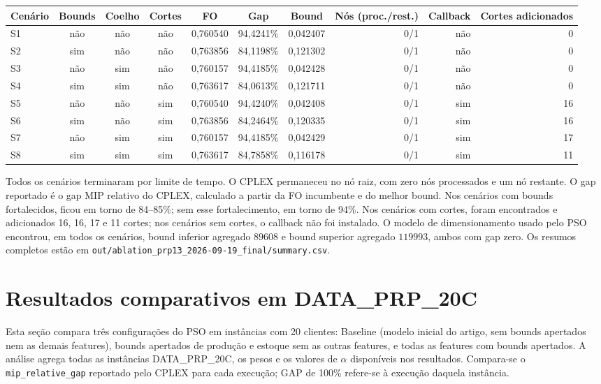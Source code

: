 \documentclass[11pt,a4paper]{article}
\begin{document}
\begin{center}
\small
\begin{tabular}{lccccccrrr}
\toprule
Cenário & Bounds & Coelho & Cortes & FO & Gap & Bound & Nós (proc./rest.) & Callback & Cortes adicionados \\
\midrule
S1 & não & não & não & 0,760540 & 94,4241\% & 0,042407 & 0/1 & não & 0 \\
S2 & sim & não & não & 0,763856 & 84,1198\% & 0,121302 & 0/1 & não & 0 \\
S3 & não & sim & não & 0,760157 & 94,4185\% & 0,042428 & 0/1 & não & 0 \\
S4 & sim & sim & não & 0,763617 & 84,0613\% & 0,121711 & 0/1 & não & 0 \\
S5 & não & não & sim & 0,760540 & 94,4240\% & 0,042408 & 0/1 & sim & 16 \\
S6 & sim & não & sim & 0,763856 & 84,2464\% & 0,120335 & 0/1 & sim & 16 \\
S7 & não & sim & sim & 0,760157 & 94,4185\% & 0,042429 & 0/1 & sim & 17 \\
S8 & sim & sim & sim & 0,763617 & 84,7858\% & 0,116178 & 0/1 & sim & 11 \\
\bottomrule
\end{tabular}
\end{center}

Todos os cenários terminaram por limite de tempo. O CPLEX permaneceu no nó
raiz, com zero nós processados e um nó restante. O gap reportado é o gap MIP
relativo do CPLEX, calculado a partir da FO incumbente e do melhor bound. Nos
cenários com bounds fortalecidos, ficou em torno de 84--85\%; sem esse
fortalecimento, em torno de 94\%. Nos cenários com cortes, foram encontrados
e adicionados 16, 16, 17 e 11 cortes; nos cenários sem cortes, o callback não
foi instalado. O modelo de dimensionamento usado pelo PSO encontrou, em todos
os cenários, bound inferior agregado $89608$ e bound superior agregado
$119993$, ambos com gap zero. Os resumos completos estão em
\texttt{out/ablation\_prp13\_2026-09-19\_final/summary.csv}.

\section{Resultados comparativos em DATA\_PRP\_20C}

Esta seção compara três configurações do PSO em instâncias com 20 clientes:
Baseline (modelo inicial do artigo, sem bounds apertados nem as demais
features), bounds apertados de produção e estoque sem as outras features, e
todas as features com bounds apertados. A análise agrega todas as instâncias
DATA\_PRP\_20C, os pesos e os valores de $\alpha$ disponíveis nos resultados.
Compara-se o \texttt{mip\_relative\_gap} reportado pelo CPLEX para cada
execução; GAP de 100\% refere-se à execução daquela instância.
\end{document}
